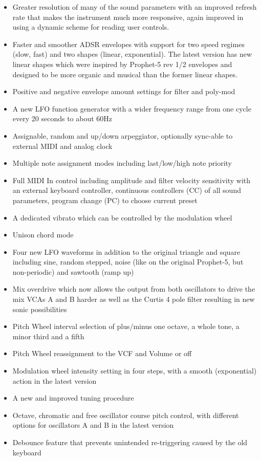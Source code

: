 \documentclass[landscape, 11pt, oneside, twoside]{report}
\newenvironment{flowtext}{\addmargin[0cm]{0cm}}{\endaddmargin} %
\begin{document}
\begin{flowtext}
\begin{itemize}
  \setlength\itemsep{0cm}
  \item Greater resolution of many of the sound parameters with an improved refresh rate that makes the instrument much more responsive, again improved in \version using a dynamic scheme for reading user controls.
  \item Faster and smoother ADSR envelopes with support for two speed regimes (slow, fast) and two shapes (linear, exponential). The latest version \version has new linear shapes which were inspired by Prophet-5 rev 1/2 envelopes and designed to be more organic and musical than the former linear shapes.
  \item Positive and negative envelope amount settings for filter and poly-mod 
  \item A new LFO function generator with a wider frequency range from one cycle every 20 seconds to about 60Hz
  \item Assignable, random and up/down arpeggiator, optionally sync-able to external MIDI and analog clock
  \item Multiple note assignment modes including last/low/high note priority
  \item Full MIDI In control including amplitude and filter velocity sensitivity with an external keyboard controller, continuous controllers (CC) of all sound parameters, program change (PC) to choose current preset
  \item A dedicated vibrato which can be controlled by the modulation wheel
  \item Unison chord mode
  \item Four new LFO waveforms in addition to the original triangle and square including sine, random stepped, noise (like on the original Prophet-5, but non-periodic) and sawtooth (ramp up)
  \item Mix overdrive which now allows the output from both oscillators to drive the mix VCAs A and B harder as well as the Curtis 4 pole filter resulting in new sonic possibilities
  \item Pitch Wheel interval selection of plus/minus one octave, a whole tone, a minor third and a fifth
  \item Pitch Wheel reassignment to the VCF and Volume or off   
  \item Modulation wheel intensity setting in four steps, with a smooth (exponential) action in the latest version \version
  \item A new and improved tuning procedure
  \item Octave, chromatic and free oscillator course pitch control, with different options for oscillators A and B in the latest version \version
  \item Debounce feature that prevents unintended re-triggering caused by the old keyboard
\end{itemize}


\end{flowtext}
\end{document}
